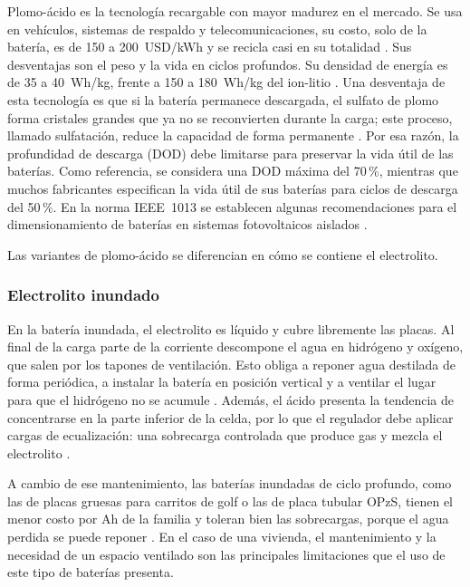 Plomo-ácido es la tecnología recargable con mayor madurez en el mercado. Se usa en vehículos, sistemas de respaldo y telecomunicaciones, su costo, solo de la batería, es de 150 a \SI{200}{USD/kWh} y se recicla casi en su totalidad \cite{may2018}. Sus desventajas son el peso y la vida en ciclos profundos. Su densidad de energía es de 35 a \SI{40}{Wh/kg}, frente a 150 a \SI{180}{Wh/kg} del ion-litio \cite{may2018}. Una desventaja de esta tecnología es que si la batería permanece descargada, el sulfato de plomo forma cristales grandes que ya no se reconvierten durante la carga; este proceso, llamado sulfatación, reduce la capacidad de forma permanente \cite{pavlov}. Por esa razón, la profundidad de descarga (DOD) debe limitarse para preservar la vida útil de las baterías. Como referencia, se considera una DOD máxima del 70\,\%, mientras que muchos fabricantes especifican la vida útil de sus baterías para ciclos de descarga del 50\,\%. En la norma IEEE~1013 se establecen algunas recomendaciones para el dimensionamiento de baterías en sistemas fotovoltaicos aislados \cite{ieee1013}.

Las variantes de plomo-ácido se diferencian en cómo se contiene el electrolito.

\subsubsection{Electrolito inundado}

En la batería inundada, el electrolito es líquido y cubre libremente las placas. Al final de la carga parte de la corriente descompone el agua en hidrógeno y oxígeno, que salen por los tapones de ventilación. Esto obliga a reponer agua destilada de forma periódica, a instalar la batería en posición vertical y a ventilar el lugar para que el hidrógeno no se acumule \cite{linden}. Además, el ácido presenta la tendencia de concentrarse en la parte inferior de la celda, por lo que el regulador debe aplicar cargas de ecualización: una sobrecarga controlada que produce gas y mezcla el electrolito \cite{pavlov}.

A cambio de ese mantenimiento, las baterías inundadas de ciclo profundo, como las de placas gruesas para carritos de golf o las de placa tubular OPzS, tienen el menor costo por Ah de la familia y toleran bien las sobrecargas, porque el agua perdida se puede reponer \cite{pavlov}. En el caso de una vivienda, el mantenimiento y la necesidad de un espacio ventilado son las principales limitaciones que el uso de este tipo de baterías presenta.

